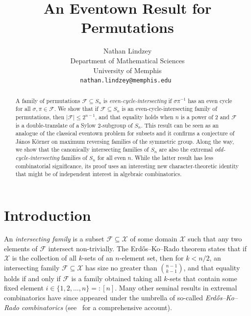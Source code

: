 \documentclass[12pt]{article}
\title{\bf An Eventown Result for Permutations}
\author{
Nathan Lindzey\\
\small Department of Mathematical Sciences\\[-0.8ex]
\small University of Memphis\\[-0.8ex] 
\small\tt nathan.lindzey@memphis.edu
}
\begin{document}
\maketitle
\frenchspacing

\begin{abstract}
A family of permutations $\mathcal{F} \subseteq S_n$ is \emph{even-cycle-intersecting} if $\sigma \pi^{-1}$ has an even cycle for all $\sigma,\pi \in \mathcal{F}$. 
We show that if $\mathcal{F} \subseteq S_n$ is an even-cycle-intersecting family of permutations, then $|\mathcal{F}| \leq 2^{n-1}$, and that equality holds when $n$ is a power of 2 and $\mathcal{F}$ is a double-translate of a Sylow 2-subgroup of $S_n$. This result can be seen as an analogue of the classical eventown problem for subsets and it  confirms a conjecture of J\'anos K\"orner on maximum reversing families of the symmetric group. Along the way, we show that the canonically intersecting families of $S_n$ are also the extremal  \emph{odd-cycle-intersecting} families of $S_n$ for all even $n$. While the latter result has less combinatorial significance, its proof uses an interesting new character-theoretic identity that might be of independent interest in algebraic combinatorics. 
\end{abstract}


\section{Introduction}

An \emph{intersecting family} is a subset $\mathcal{F} \subseteq \mathcal{X}$ of some domain $\mathcal{X}$ such that any two elements of $\mathcal{F}$ intersect non-trivially. The Erd\H{o}s--Ko--Rado theorem states that if $\mathcal{X}$ is the collection of all $k$-sets of an $n$-element set, then for $k < n/2$, an intersecting family $\mathcal{F} \subseteq \mathcal{X}$ has size no greater than $\binom{n-1}{k-1}$, and that equality holds if and only if $\mathcal{F}$ is a family obtained taking all $k$-sets that contain some fixed element $i \in \{1,2,\ldots,n\} =: [n]$. Many other seminal results in extremal combinatorics have since appeared under the umbrella of so-called \emph{Erd\H{o}s--Ko--Rado combinatorics} (see~\cite{GodsilMeagher} for a comprehensive account).
\end{document}
